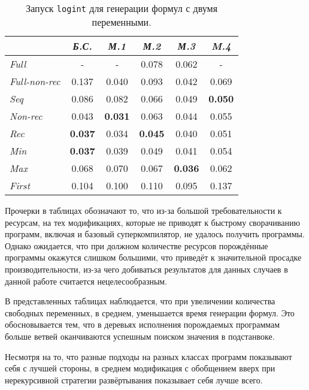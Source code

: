 \begin{table}[h!]
\center
\begin{tabular}{|l|c|c|c|c|c|}
\hline
   &{\it Б.С.}&{\it М.1}&{\it М.2}&{\it М.3}&{\it M.4} \\ \hline
{\it Full        }&    -        &    -        & 0.078       & 0.062      &    - \\ \hline
{\it Full-non-rec}& 0.137       & 0.040       & 0.093       & 0.042      & 0.069 \\ \hline
{\it Seq         }& 0.086       & 0.082       & 0.066       & 0.049      & {\bf 0.050} \\ \hline
{\it Non-rec     }& 0.043       & {\bf 0.031} & 0.063       & 0.044      & 0.055 \\ \hline
{\it Rec         }& {\bf 0.037} & 0.034       & {\bf 0.045} & 0.040      & 0.051 \\ \hline
{\it Min         }& {\bf 0.037} & 0.039       & 0.049       & 0.041      & 0.054 \\ \hline
{\it Max         }& 0.068       & 0.070       & 0.067       &{\bf 0.036} & 0.062 \\ \hline
{\it First       }& 0.104       & 0.100       & 0.110       & 0.095      & 0.137 \\ \hline
\end{tabular}
\caption{Запуск \lstinline{logint} для генерации формул с двумя переменными.}
\label{fig:logintTest3}
\end{table}

Прочерки в таблицах обозначают то, что из-за большой требовательности к ресурсам,
на тех модификациях, которые не приводят к быстрому сворачиванию программ,
включая и базовый суперкомпилятор, не удалось получить программы. Однако ожидается,
что при должном количестве ресурсов порождённые программы окажутся слишком большими,
что приведёт к значительной просадке производительности, из-за чего добиваться результатов
для данных случаев в данной работе считается нецелесообразным.

В представленных таблицах наблюдается, что при увеличении количества свободных переменных,
в среднем, уменьшается время генерации формул. Это обосновывается тем, что в
деревьях исполнения порождаемых программам больше ветвей оканчиваются успешным
поиском значения в подстанвоке.



Несмотря на то, что разные подходы на разных классах программ показывают
себя с лучшей стороны, в среднем модификация с обобщением вверх при
нерекурсивной стратегии развёртывания показывает себя лучше всего.

